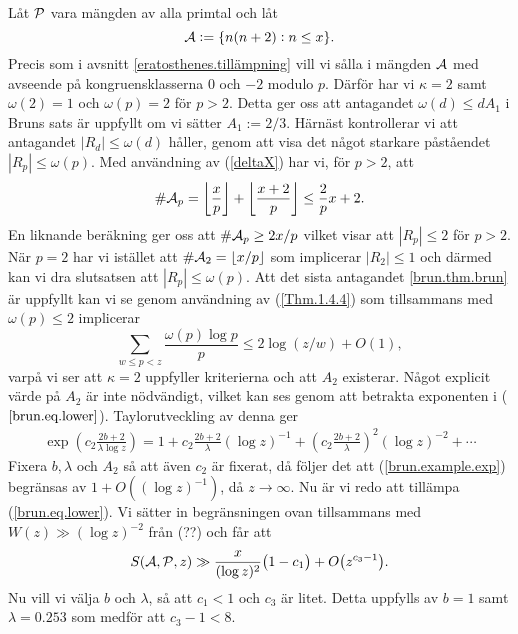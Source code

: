Låt $\P$ vara mängden av alla primtal och låt
\begin{equation*}
    \A := \{n(n+2): n\leq x\}.
\end{equation*}
Precis som i avsnitt \ref{eratosthenes.tillämpning} vill vi sålla i mängden $\A$ med avseende på kongruensklasserna $0$ och $-2$ modulo $p$. Därför har vi $\kappa=2$ samt $\omega(2)=1$ och $\omega(p)=2$ för $p>2$.
Detta ger oss att antagandet $\omega(d)\leq dA_1$ i Bruns sats är uppfyllt om vi sätter $A_1:=2/3$.
Härnäst kontrollerar vi att antagandet $|R_d|\leq \omega(d)$ håller, genom att visa det något starkare påståendet $|R_p|\leq \omega(p)$. Med användning av (\ref{deltaX}) har vi, för $p>2$, att 
\begin{equation*}
    \card \A_p = \left\lfloor \frac{x}{p} \right\rfloor + \left\lfloor \frac{x+2}{p} \right\rfloor 
    \leq \frac{2}{p}x +2.
\end{equation*}
En liknande beräkning ger oss att $\card \A_p\geq 2x/p$ vilket visar att $|R_p|\leq 2$ för $p>2$.
När $p=2$ har vi istället att $\card\A_2=\lfloor x/p \rfloor$ som implicerar $|R_2|\leq 1$ och därmed kan vi dra slutsatsen att $|R_p|\leq \omega(p)$. 
Att det sista antagandet \ref{brun.thm.brun} är uppfyllt kan vi se genom användning av (\ref{Thm.1.4.4}) som tillsammans med $\omega(p)\leq2$ implicerar
\begin{equation*}
    \sum_{w\leq p<z} \frac{\omega(p)\log p}{p} \leq 2\log\left(z/w\right) + O(1),
\end{equation*}
varpå vi ser att $\kappa=2$ uppfyller kriterierna och att $A_2$ existerar.
Något explicit värde på $A_2$ är inte nödvändigt, vilket kan ses genom att betrakta exponenten i ($\ref{brun.eq.lower}$). Taylorutveckling av denna ger
\begin{align}\label{brun.example.exp}
    \exp\left(c_2\frac{2b+2}{\lambda\log z}\right) = 1 + c_2\frac{2b+2}{\lambda}(\log z)^{-1} + \left(c_2\frac{2b+2}{\lambda}\right)^2(\log z)^{-2} + \cdots
\end{align}
Fixera $b,\lambda$ och $A_2$ så att även $c_2$ är fixerat, då följer det att (\ref{brun.example.exp}) begränsas av $1+O((\log z)^{-1})$, då $z\to\infty$.
Nu är vi redo att tillämpa (\ref{brun.eq.lower}). 
Vi sätter in begränsningen ovan tillsammans med $W(z) \gg (\log z)^{-2}$ från (??) och får att
\begin{equation} \label{brun.example.sap}
    \S{A}{P}{z} \gg \frac{x}{(\log z)^2}\bigl(1 - c_1\bigr) + O\bigl(z^{c_3 - 1}\bigr).
\end{equation}
Nu vill vi välja $b$ och $\lambda$, så att $c_1<1$ och $c_3$ är litet. 
Detta uppfylls av $b=1$ samt $\lambda=0.253$ som medför att $c_3-1<8$.

